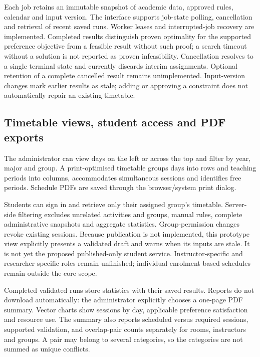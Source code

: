 \documentclass[
  11pt,a4paper,oneside]{report}
\begin{document}
Each job retains an immutable snapshot of academic data, approved rules, calendar and input version. The interface supports job-state polling, cancellation and retrieval of recent saved runs. Worker leases and interrupted-job recovery are implemented. Completed results distinguish proven optimality for the supported preference objective from a feasible result without such proof; a search timeout without a solution is not reported as proven infeasibility. Cancellation resolves to a single terminal state and currently discards interim assignments. Optional retention of a complete cancelled result remains unimplemented. Input-version changes mark earlier results as stale; adding or approving a constraint does not automatically repair an existing timetable.

\subsection{Timetable views, student access and PDF exports}
The administrator can view days on the left or across the top and filter by year, major and group. A print-optimised timetable groups days into rows and teaching periods into columns, accommodates simultaneous sessions and identifies free periods. Schedule PDFs are saved through the browser/system print dialog.

Students can sign in and retrieve only their assigned group's timetable. Server-side filtering excludes unrelated activities and groups, manual rules, complete administrative snapshots and aggregate statistics. Group-permission changes revoke existing sessions. Because publication is not implemented, this prototype view explicitly presents a validated draft and warns when its inputs are stale. It is not yet the proposed published-only student service. Instructor-specific and researcher-specific roles remain unfinished; individual enrolment-based schedules remain outside the core scope.

Completed validated runs store statistics with their saved results. Reports do not download automatically: the administrator explicitly chooses a one-page PDF summary. Vector charts show sessions by day, applicable preference satisfaction and resource use. The summary also reports scheduled versus required sessions, supported validation, and overlap-pair counts separately for rooms, instructors and groups. A pair may belong to several categories, so the categories are not summed as unique conflicts.
\end{document}
